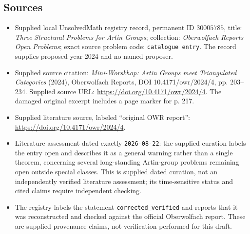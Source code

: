 \documentclass[11pt]{article}
\begin{document}
\subsection{Sources}
\begin{itemize}
\item Supplied local UnsolvedMath registry record, permanent ID \(30005785\), title: \emph{Three Structural Problems for Artin Groups}; collection: \emph{Oberwolfach Reports Open Problems}; exact source problem code: \texttt{catalogue entry}. The record supplies proposed year 2024 and no named proposer.
\item Supplied source citation: \emph{Mini-Worskhop: Artin Groups meet Triangulated Categories} (2024), Oberwolfach Reports, DOI 10.4171/owr/2024/4, pp. 203--234. Supplied source URL: \url{https://doi.org/10.4171/owr/2024/4}. The damaged original excerpt includes a page marker for p. 217.
\item Supplied literature source, labeled ``original OWR report'': \url{https://doi.org/10.4171/owr/2024/4}.
\item Literature assessment dated exactly \texttt{2026-08-22}: the supplied curation labels the entry open and describes it as a general warning rather than a single theorem, concerning several long-standing Artin-group problems remaining open outside special classes. This is supplied dated curation, not an independently verified literature assessment; its time-sensitive status and cited claims require independent checking.
\item The registry labels the statement \texttt{corrected\_verified} and reports that it was reconstructed and checked against the official Oberwolfach report. These are supplied provenance claims, not verification performed for this draft.
\end{itemize}
\end{document}
